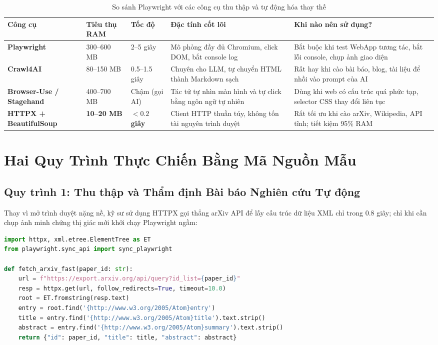 \documentclass[a4paper,11pt]{report}
\begin{document}
\begin{table}[htbp]
\centering
\small
\caption{So sánh Playwright với các công cụ thu thập và tự động hóa thay thế}
\vspace{0.5em}
\begin{tabularx}{\textwidth}{L{2.5cm} L{2cm} L{2.2cm} L{3.5cm} Y}
\toprule
\textbf{Công cụ} & \textbf{Tiêu thụ RAM} & \textbf{Tốc độ} & \textbf{Đặc tính cốt lõi} & \textbf{Khi nào nên sử dụng?} \\
\midrule
\textbf{Playwright} & 300--600 MB & 2--5 giây & Mô phỏng đầy đủ Chromium, click DOM, bắt console log & Bắt buộc khi test WebApp tương tác, bắt lỗi console, chụp ảnh giao diện \\
\textbf{Crawl4AI} & 80--150 MB & 0.5--1.5 giây & Chuyên cho LLM, tự chuyển HTML thành Markdown sạch & Rất hay khi cào bài báo, blog, tài liệu để nhồi vào prompt của AI \\
\textbf{Browser-Use / Stagehand} & 400--700 MB & Chậm (gọi AI) & Tác tử tự nhìn màn hình và tự click bằng ngôn ngữ tự nhiên & Dùng khi web có cấu trúc quá phức tạp, selector CSS thay đổi liên tục \\
\textbf{HTTPX + BeautifulSoup} & \textbf{10--20 MB} & \textbf{$< 0.2$ giây} & Client HTTP thuần túy, không tốn tài nguyên trình duyệt & Rất tối ưu khi cào arXiv, Wikipedia, API tĩnh; tiết kiệm 95\% RAM \\
\bottomrule
\end{tabularx}
\end{table}

\section{Hai Quy Trình Thực Chiến Bằng Mã Nguồn Mẫu}

\subsection{Quy trình 1: Thu thập và Thẩm định Bài báo Nghiên cứu Tự động}
Thay vì mở trình duyệt nặng nề, kỹ sư sử dụng HTTPX gọi thẳng arXiv API để lấy cấu trúc dữ liệu XML chỉ trong 0.8 giây; chỉ khi cần chụp ảnh minh chứng thị giác mới khởi chạy Playwright ngầm:

\begin{lstlisting}[language=python, caption={Kich ban thu thap bai bao sieu nhe voi Playwright va HTTPX}]
import httpx, xml.etree.ElementTree as ET
from playwright.sync_api import sync_playwright

def fetch_arxiv_fast(paper_id: str):
    url = f"https://export.arxiv.org/api/query?id_list={paper_id}"
    resp = httpx.get(url, follow_redirects=True, timeout=10.0)
    root = ET.fromstring(resp.text)
    entry = root.find('{http://www.w3.org/2005/Atom}entry')
    title = entry.find('{http://www.w3.org/2005/Atom}title').text.strip()
    abstract = entry.find('{http://www.w3.org/2005/Atom}summary').text.strip()
    return {"id": paper_id, "title": title, "abstract": abstract}
\end{lstlisting}
\end{document}
